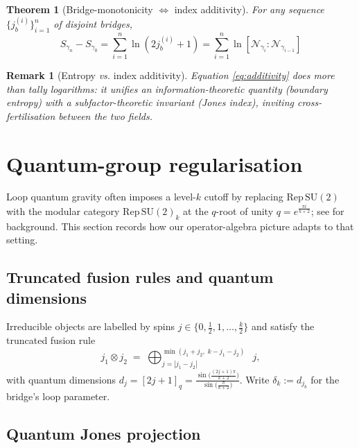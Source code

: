 \documentclass[11pt]{article}
\newtheorem{theorem}{Theorem}[section]
\newtheorem{remark}{Remark}[section]
\begin{document}
\begin{theorem}[Bridge-monotonicity $\Leftrightarrow$ index additivity]
  For any sequence $\{j_b^{(i)}\}_{i=1}^{n}$ of disjoint bridges,
  \[
    S_{\gamma_n}-S_{\gamma_0}
    =\sum_{i=1}^{n}\ln\!(2j_b^{(i)}+1)
    =\sum_{i=1}^{n}\ln[\mathcal N_{\gamma_i}:\mathcal N_{\gamma_{i-1}}]
    \tag{\thetheorem}\label{eq:additivity}
  \]
\end{theorem}

\begin{remark}[Entropy \emph{vs.} index additivity]\label{rem:additivity}
  Equation \eqref{eq:additivity} does more than tally logarithms:
  it unifies an \emph{information-theoretic} quantity
  (boundary entropy) with a \emph{subfactor-theoretic} invariant
  (Jones index), inviting cross-fertilisation between the two fields.
\end{remark}

\section{Quantum-group regularisation}\label{sec:qgroup}

Loop quantum gravity often imposes a level-$k$ cutoff by replacing
$\mathrm{Rep}\,\mathrm{SU}(2)$ with the modular category
$\mathrm{Rep}\,\mathrm{SU}(2)_k$ at the $q$-root of unity
$q=e^{\frac{\pi i}{k+2}}$; see \cite{BakalovKirillov} for background. This section records how our operator-algebra
picture adapts to that setting.

\subsection{Truncated fusion rules and quantum dimensions}

Irreducible objects are labelled by spins
$j\in\{0,\tfrac12,1,\dots,\tfrac{k}{2}\}$ and satisfy the truncated fusion
rule
\[
  j_1\otimes j_2
  \;=\;
  \bigoplus_{j=|j_1-j_2|}^{\min(j_1+j_2,\;k-j_1-j_2)}
  \!\!\!\!\!\!\!\!\!\!\!\!\!\!\!\!\;\;j,
\]
with quantum dimensions
\(
  d_j=[2j+1]_q
  =\frac{\sin\!\bigl(\frac{(2j+1)\pi}{k+2}\bigr)}
  {\sin\!\bigl(\frac{\pi}{k+2}\bigr)}.
\)
Write $\delta_k:=d_{j_b}$ for the bridge's loop parameter.

\subsection{Quantum Jones projection}
\end{document}
